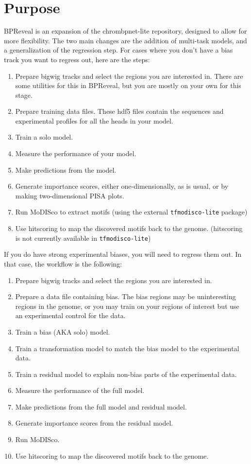 \documentclass{article}
\begin{document}
\section{Purpose}

BPReveal is an expansion of the chrombpnet-lite repository, designed to allow for more flexibility. 
The two main changes are the addition of multi-task models, and a generalization of the regression step. 
For cases where you don't have a bias track you want to regress out, here are the steps: 

\begin{enumerate}
    \item Prepare bigwig tracks and select the regions you are interested in. There are some utilities for this in BPReveal, but you are mostly on your own for this stage. 
    \item Prepare training data files. These hdf5 files contain the sequences and experimental profiles for all the heads in your model.
    \item Train a solo model. 
    \item Measure the performance of your model. 
    \item Make predictions from the model.
    \item Generate importance scores, either one-dimensionally, as is usual, or by making two-dimensional PISA plots. 
    \item Run MoDISco to extract motifs (using the external \texttt{tfmodisco-lite} package)
    \item Use hitscoring to map the discovered motifs back to the genome. (hitscoring is not currently available in \texttt{tfmodisco-lite})
\end{enumerate}

If you do have strong experimental biases, you will need to regress them out. In that case, the workflow is the following:

\begin{enumerate}
    \item Prepare bigwig tracks and select the regions you are interested in.  
    \item Prepare a data file containing bias. The bias regions may be uninteresting regions in the genome, or you may train on your regions of interest but use an experimental control for the data. 
    \item Train a bias (AKA solo) model. 
    \item Train a transformation model to match the bias model to the experimental data. 
    \item Train a residual model to explain non-bias parts of the experimental data. 
    \item Measure the performance of the full model. 
    \item Make predictions from the full model and residual model.
    \item Generate importance scores from the residual model. 
    \item Run MoDISco. 
    \item Use hitscoring to map the discovered motifs back to the genome.
\end{enumerate}
\end{document}

